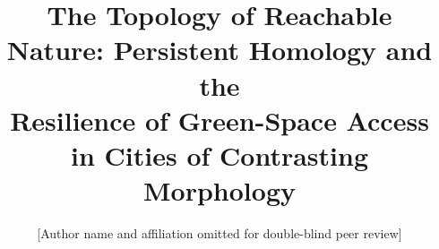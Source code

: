 \documentclass[11pt]{article}
\title{The Topology of Reachable Nature: Persistent Homology and the\\
Resilience of Green-Space Access in Cities of Contrasting Morphology}
\author{\normalsize [Author name and affiliation omitted for double-blind peer review]}
\date{}
\begin{document}
\maketitle

\begin{abstract}

\end{abstract}





\end{document}
